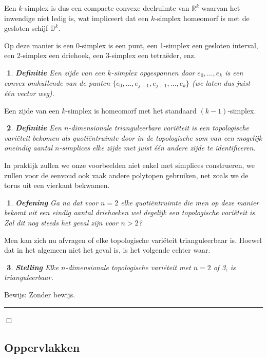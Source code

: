 \documentclass[12pt]{book}
\newcommand{\R}{\mathbb{R}}
\newcommand{\bew}{{\sc Bewijs: }}
\newcommand{\B}{\rule{1mm}{0mm} \hfill $\Box$ }
\newtheorem{stelh}{$\!\!$}[section]
\newenvironment{stel}{\begin{stelh}{\em {\bf Stelling }}}{\end{stelh}}
\newtheorem{dfh}[stelh]{$\!\!$}
\newenvironment{df}{\begin{dfh} \em {\bf Definitie }}{\end{dfh}}
\newtheorem{eoef}{$\!\!$}[chapter]
\newenvironment{oef}{\begin{eoef} {\bf Oefening}}{\end{eoef}}
\begin{document}
Een $k$-simplex is dus een compacte convexe deelruimte van $\R^k$ waarvan het inwendige niet ledig is, wat impliceert dat een $k$-simplex homeomorf is met de gesloten schijf $\mathbb{D}^{k}$. %

Op deze manier is een 0-simplex is een punt, een 1-simplex een gesloten interval, een 2-simplex een driehoek, een 3-simplex een tetra\"{e}der, enz. 

\begin{df}
Een {\em zijde} van een $k$-simplex opgespannen door $e_0, \ldots , e_k$  is een convex-omhullende van de punten $\{e_0, \ldots , e_{j-1}, e_{j+1}, \ldots , e_k\}$ (we laten dus juist \'e\'en vector weg). 
\end{df}

Een zijde van een $k$-simplex is homeomorf met het standaard $(k-1)$-simplex.




\begin{df}
Een $n$-dimensionale {\em trianguleerbare vari\"eteit} is een topologische vari\"eteit bekomen als quoti\"entruimte door in de topologische som van een mogelijk oneindig aantal $n$-simplices elke zijde met juist \'e\'en andere zijde te identificeren.
\end{df}

In praktijk zullen we onze voorbeelden niet enkel met simplices construeren, we zullen voor de eenvoud ook vaak andere polytopen gebruiken, net zoals we de torus uit een vierkant bekwamen.


\begin{oef}
Ga na dat voor $n=2$ elke quoti\"entruimte die men op deze manier bekomt uit een eindig aantal driehoeken wel degelijk een topologische vari\"eteit is. Zal dit nog steeds het geval zijn voor $n > 2$?
\end{oef}

Men kan zich nu afvragen of elke topologische vari\"eteit trianguleerbaar is. Hoewel dat in het algemeen niet het geval is, is het volgende echter waar.


\begin{stel} \label{stel:triang}
Elke $n$-dimensionale topologische vari\"eteit met $n=2$ of 3, is trianguleerbaar.
\end{stel}
\bew
Zonder bewijs.
\B


\subsection{Oppervlakken}\label{opps}
\end{document}
